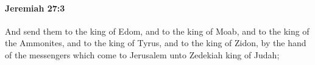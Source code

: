 
		\paragraph{Jeremiah 27:3} %
			\label{JEREMIAH-27-3}

			And send them to the king of Edom, and to the king of Moab, and to the king of the Ammonites, and to the king of Tyrus, and to the king of Zidon, by the hand of the messengers which come to Jerusalem unto Zedekiah king of Judah;


